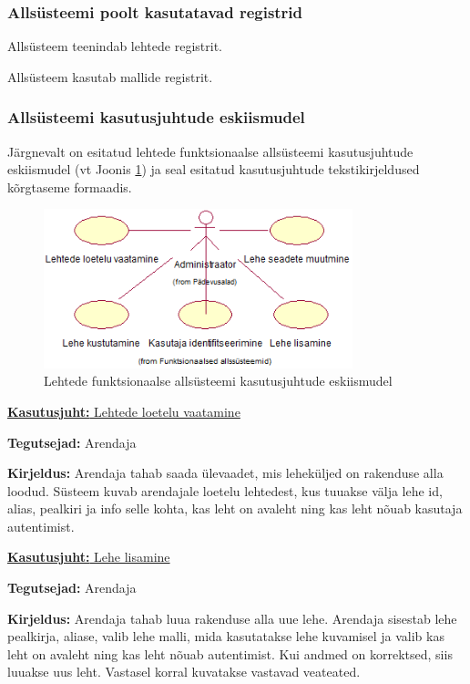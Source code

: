 \documentclass[a4paper,12pt]{article} %
\begin{document}
\subsubsection{Allsüsteemi poolt kasutatavad registrid}
Allsüsteem teenindab lehtede registrit.\par
Allsüsteem kasutab mallide registrit.
\subsubsection{Allsüsteemi kasutusjuhtude eskiismudel}
Järgnevalt on esitatud lehtede funktsionaalse allsüsteemi kasutusjuhtude eskiismudel (vt Joonis \ref{fig_lehtede_funktsionaalse_allsüsteemi_kasutusjuhtude_eskiismudel}) ja seal esitatud kasutusjuhtude tekstikirjeldused kõrgtaseme formaadis.
\begin{figure}[H]
\centering
\includegraphics[width=0.8\textwidth]{./diagrams/pages-subsystem-use-case-digram.png}
\caption{Lehtede funktsionaalse allsüsteemi kasutusjuhtude eskiismudel}
\label{fig_lehtede_funktsionaalse_allsüsteemi_kasutusjuhtude_eskiismudel}
\end{figure}

\underline{\textbf{Kasutusjuht:} Lehtede loetelu vaatamine}
\par
\textbf{Tegutsejad:} Arendaja
\par
\textbf{Kirjeldus:} Arendaja tahab saada ülevaadet, mis leheküljed on rakenduse alla loodud. Süsteem kuvab arendajale loetelu lehtedest, kus tuuakse välja lehe id, alias, pealkiri ja info selle kohta, kas leht on avaleht ning kas leht nõuab kasutaja autentimist.
\par

\underline{\textbf{Kasutusjuht:} Lehe lisamine}
\par
\textbf{Tegutsejad:} Arendaja
\par
\textbf{Kirjeldus:} Arendaja tahab luua rakenduse alla uue lehe. Arendaja sisestab lehe pealkirja, aliase, valib lehe malli, mida kasutatakse lehe kuvamisel ja valib kas leht on avaleht ning kas leht nõuab autentimist. Kui andmed on korrektsed, siis luuakse uus leht. Vastasel korral kuvatakse vastavad veateated.
\par
\end{document}
